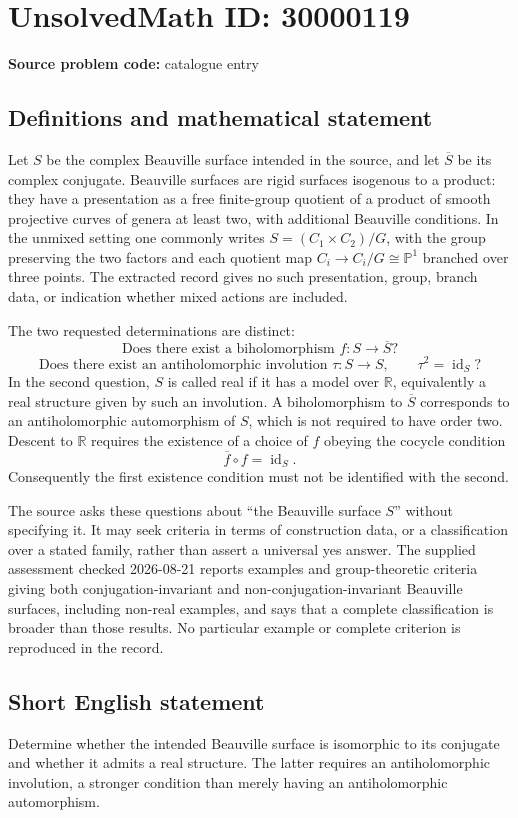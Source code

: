 \documentclass[11pt]{article}
\newcommand{\R}{\mathbb{R}}
\newcommand{\PP}{\mathbb{P}}
\begin{document}
\section*{UnsolvedMath ID: 30000119}
\textbf{Source problem code:} catalogue entry
\subsection{Definitions and mathematical statement}
Let \(S\) be the complex Beauville surface intended in the source, and let \(\overline S\) be its complex conjugate. Beauville surfaces are rigid surfaces isogenous to a product: they have a presentation as a free finite-group quotient of a product of smooth projective curves of genera at least two, with additional Beauville conditions. In the unmixed setting one commonly writes \(S=(C_1\times C_2)/G\), with the group preserving the two factors and each quotient map \(C_i\to C_i/G\cong\PP^1\) branched over three points. The extracted record gives no such presentation, group, branch data, or indication whether mixed actions are included.

The two requested determinations are distinct:
\[
\text{Does there exist a biholomorphism }f:S\longrightarrow\overline S?
\]
\[
\text{Does there exist an antiholomorphic involution }\tau:S\longrightarrow S,
\qquad\tau^2=\operatorname{id}_S?
\]
In the second question, \(S\) is called real if it has a model over \(\R\), equivalently a real structure given by such an involution. A biholomorphism to \(\overline S\) corresponds to an antiholomorphic automorphism of \(S\), which is not required to have order two. Descent to \(\R\) requires the existence of a choice of \(f\) obeying the cocycle condition
\[
\overline f\circ f=\operatorname{id}_S.
\]
Consequently the first existence condition must not be identified with the second.

The source asks these questions about ``the Beauville surface \(S\)'' without specifying it. It may seek criteria in terms of construction data, or a classification over a stated family, rather than assert a universal yes answer. The supplied assessment checked 2026-08-21 reports examples and group-theoretic criteria giving both conjugation-invariant and non-conjugation-invariant Beauville surfaces, including non-real examples, and says that a complete classification is broader than those results. No particular example or complete criterion is reproduced in the record.
\subsection{Short English statement}
Determine whether the intended Beauville surface is isomorphic to its conjugate and whether it admits a real structure. The latter requires an antiholomorphic involution, a stronger condition than merely having an antiholomorphic automorphism.
\end{document}
